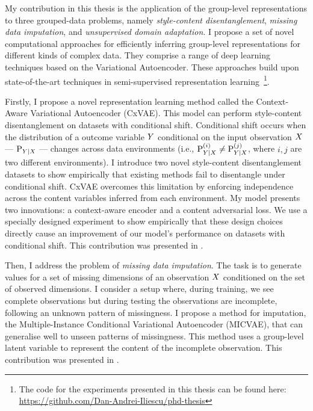 \documentclass[../thesis.tex]{subfiles}
\begin{document}
My contribution in this thesis is the application of the group-level representations to three grouped-data problems, namely \textit{style-content disentanglement}, \textit{missing data imputation}, and \textit{unsupervised domain adaptation}. I propose a set of novel computational approaches for efficiently inferring group-level representations for different kinds of complex data. They comprise a range of deep learning techniques based on the Variational Autoencoder. These approaches build upon state-of-the-art techniques in semi-supervised representation learning~\footnote{The code for the experiments presented in this thesis can be found here: \href{https://github.com/Dan-Andrei-Iliescu/phd-thesis}{https://github.com/Dan-Andrei-Iliescu/phd-thesis}}.

Firstly, I propose a novel representation learning method called the Context-Aware Variational Autoencoder (CxVAE). This model can perform style-content disentanglement on datasets with conditional shift. Conditional shift occurs when the distribution of a outcome variable $\myrv{y}$ conditional on the input observation $\myrv{x}$ --- $\mylik{P}_{\myrv{y}|\myrv{x}}$ --- changes across data environments (i.e., $\mylik{P}^{(i)}_{\myrv{y}|\myrv{x}} \neq \mylik{P}^{(j)}_{\myrv{y}|\myrv{x}}$, where $i,j$ are two different environments). I introduce two novel style-content disentanglement datasets to show empirically that existing methods fail to disentangle under conditional shift. CxVAE overcomes this limitation by enforcing independence across the content variables inferred from each environment. My model presents two innovations: a context-aware encoder and a content adversarial loss. We use a specially designed experiment to show empirically that these design choices directly cause an improvement of our model's performance on datasets with conditional shift. This contribution was presented in \citet{iliescuStyleContentDisentanglementConditional2024}.

Then, I address the problem of \textit{missing data imputation}. The task is to generate values for a set of missing dimensions of an observation $\myrv{X}$ conditioned on the set of observed dimensions. I consider a setup where, during training, we see complete observations but during testing the observations are incomplete, following an unknown pattern of missingness. I propose a method for imputation, the Multiple-Instance Conditional Variational Autoencoder (MICVAE), that can generalise well to unseen patterns of missingness. This method uses a group-level latent variable to represent the content of the incomplete observation. This contribution was presented in \citet{iliescuControllableProsodyGeneration2024a}.
\end{document}
